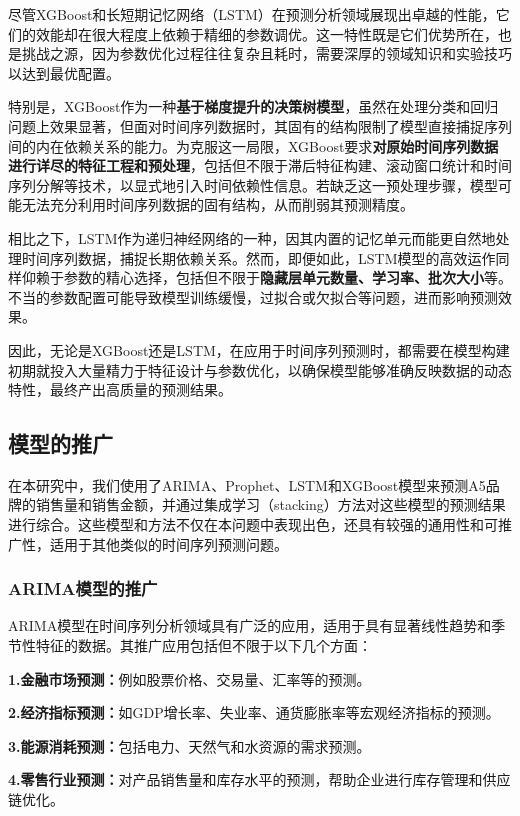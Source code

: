 \documentclass[a4paper]{article}
\begin{document}
	尽管XGBoost和长短期记忆网络（LSTM）在预测分析领域展现出卓越的性能，它们的效能却在很大程度上依赖于精细的参数调优。这一特性既是它们优势所在，也是挑战之源，因为参数优化过程往往复杂且耗时，需要深厚的领域知识和实验技巧以达到最优配置。
	
	特别是，XGBoost作为一种\textbf{基于梯度提升的决策树模型}，虽然在处理分类和回归问题上效果显著，但面对时间序列数据时，其固有的结构限制了模型直接捕捉序列间的内在依赖关系的能力。为克服这一局限，XGBoost要求\textbf{对原始时间序列数据进行详尽的特征工程和预处理}，包括但不限于滞后特征构建、滚动窗口统计和时间序列分解等技术，以显式地引入时间依赖性信息。若缺乏这一预处理步骤，模型可能无法充分利用时间序列数据的固有结构，从而削弱其预测精度。
	
	相比之下，LSTM作为递归神经网络的一种，因其内置的记忆单元而能更自然地处理时间序列数据，捕捉长期依赖关系。然而，即便如此，LSTM模型的高效运作同样仰赖于参数的精心选择，包括但不限于\textbf{隐藏层单元数量、学习率、批次大小}等。不当的参数配置可能导致模型训练缓慢，过拟合或欠拟合等问题，进而影响预测效果。
	
	因此，无论是XGBoost还是LSTM，在应用于时间序列预测时，都需要在模型构建初期就投入大量精力于特征设计与参数优化，以确保模型能够准确反映数据的动态特性，最终产出高质量的预测结果。
	
	\subsection{模型的推广}
	在本研究中，我们使用了ARIMA、Prophet、LSTM和XGBoost模型来预测A5品牌的销售量和销售金额，并通过集成学习（stacking）方法对这些模型的预测结果进行综合。这些模型和方法不仅在本问题中表现出色，还具有较强的通用性和可推广性，适用于其他类似的时间序列预测问题。

	\subsubsection{ARIMA模型的推广}
	ARIMA模型在时间序列分析领域具有广泛的应用，适用于具有显著线性趋势和季节性特征的数据。其推广应用包括但不限于以下几个方面：

	\textbf{1.金融市场预测：}例如股票价格、交易量、汇率等的预测。

	\textbf{2.经济指标预测：}如GDP增长率、失业率、通货膨胀率等宏观经济指标的预测。

	\textbf{3.能源消耗预测：}包括电力、天然气和水资源的需求预测。

	\textbf{4.零售行业预测：}对产品销售量和库存水平的预测，帮助企业进行库存管理和供应链优化。
\end{document}
